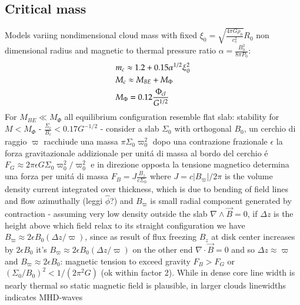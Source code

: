 \documentclass[main.tex]{subfiles}
\begin{document}
\subsection{Critical mass}
Models variing nondimensional cloud mass with fixed $\xi_0=\sqrt{\frac{4\pi G\rho_0}{c_s^2}}R_0$ non dimensional radius and magnetic to thermal pressure ratio $\alpha=\frac{B_0^2}{8\pi P_0}$:
\begin{align*}
&m_c\approx1.2+0.15\alpha^{1/2}\xi_0^2\\
&M_c\approx M_{BE}+M_{\Phi}\\
&M_{\Phi}=0.12\frac{\Phi_{cl}}{G^{1/2}}
\end{align*}
For $M_{BE}\ll M_{\Phi}$ all equilibrium configuration resemble flat slab: stability for $M<M_{\Phi}$ - $\frac{\Sigma_c}{B_c}<0.17G^{-1/2}$ - consider a slab $\Sigma_0$ with orthogonal $B_0$, un cerchio di raggio $\varpi$ racchiude una massa $\pi\Sigma_0\varpi_0^2$ dopo una contrazione frazionale $\epsilon$ la forza gravitazionale addizionale per unit\'a di massa al bordo del cerchio \'e $F_G\approx2\pi\epsilon G\Sigma_0\varpi_0^2/\varpi_0^2$ e in direzione opposta la tensione magnetico determina una forza per unit\'a di massa $F_B=J\frac{B_z}{c\Sigma_0}$ where $J=c|B_{\varpi}|/2\pi$ is the volume density current integrated over thickness, which is due to bending of field lines and flow azimuthally (leggi $\hat{\phi}$?) and $B_{\varpi}$ is small radial component generated by contraction - assuming very low density outside the slab $\nabla\wedge\vec{B}=0$, if $\Delta z$ is the height above which field relax to its straight configuration we have $B_{\varpi}\approx2\epsilon B_0(\Delta z/\varpi)$, since as result of flux freezing $B_z$ at disk center increases by $2\epsilon B_0$ it's $B_{\varpi}\approx2\epsilon B_0(\Delta z/\varpi)$ on the other end $\nabla\cdot\vec{B}=0$  and so $\Delta z\approx\varpi$ and $B_{\varpi}\approx2\epsilon B_0$: magnetic tension to exceed gravity $F_B>F_G$ or $(\Sigma_0/B_0)^2<1/(2\pi^2G)$ (ok within factor 2).
While in dense core line width is nearly thermal so static magnetic field is plausible, in larger clouds linewidths indicates MHD-waves 
\end{document}
